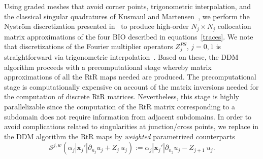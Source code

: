 \documentclass[11pt]{article}
\numberwithin{equation}{section}
\begin{document}
Using graded meshes that avoid corner points, trigonometric interpolation, and the classical singular quadratures of Kusmaul and Martensen~\cite{kusmaul,martensen}, we perform the Nystr\"om discretization presented in~\cite{dominguez2016well} to produce high-order $ N_j\times N_j$ collocation matrix approximations of the four BIO described in equations~\eqref{traces}. We note that discretizations of the Fourier multiplier operators $Z_j^{PS}$, $j=0,1$ is straightforward via trigonometric interpolation~\cite{dominguez2016well}. Based on these, the DDM algorithm proceeds with a precomputational stage whereby matrix approximations of all the RtR maps needed are produced. The precomputational stage is computationally expensive on account of the matrix inversions needed for the computation of discrete RtR matrices. Nevertheless, this stage is highly parallelizable since the computation of the RtR matrix corresponding to a subdomain does not require information from adjacent subdomains. In order to avoid complications related to singularities at junction/cross points, we replace in the DDM algorithm the RtR maps by {\em weighted} parametrized counterparts
\[
\mathcal{S}^{j,w}(\alpha_j|\mathbf{x}_j'|\partial_{n_j}u_j+Z_j\ u_j):=\alpha_j|\mathbf{x}_j'|\partial_{n_j}u_j-Z_{j+1}\ u_j.
\]
\end{document}

